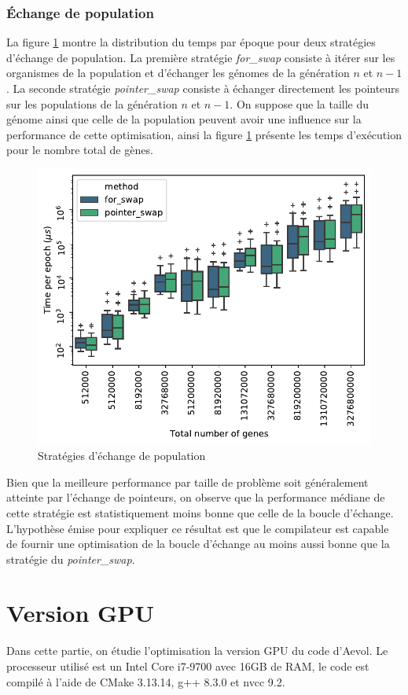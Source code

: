\documentclass[a4paper, 10pt, twoside]{article}
\begin{document}
\subsubsection{Échange de population}

La figure \ref{fig:swap/strat} montre la distribution du temps par époque pour deux stratégies d'échange de population.
La première stratégie \textit{for\_swap} consiste à itérer sur les organismes de la population et d'échanger les génomes de la génération $n$ et $n-1$.
La seconde stratégie \textit{pointer\_swap} consiste à échanger directement les pointeurs sur les populations de la génération $n$ et $n-1$.
On suppose que la taille du génome ainsi que celle de la population peuvent avoir une influence sur la performance de cette optimisation, ainsi la figure \ref{fig:swap/strat} présente les temps d'exécution pour le nombre total de gènes.

\begin{figure}[htb]
	\centering
	\includegraphics[width=0.5\linewidth]{img/swap_strategies.pdf}
	\caption{Stratégies d'échange de population}
	\label{fig:swap/strat}
\end{figure}

Bien que la meilleure performance par taille de problème soit généralement atteinte par l'échange de pointeurs, on observe que la performance médiane de cette stratégie est statistiquement moins bonne que celle de la boucle d'échange.
L'hypothèse émise pour expliquer ce résultat est que le compilateur est capable de fournir une optimisation de la boucle d'échange au moins aussi bonne que la stratégie du \textit{pointer\_swap}.

\section{Version GPU}

Dans cette partie, on étudie l'optimisation la version GPU du code d'Aevol. Le processeur utilisé est un Intel Core i7-9700 avec 16GB de RAM, le code est compilé à l'aide de CMake 3.13.14, g++ 8.3.0 et nvcc 9.2.
\end{document}
